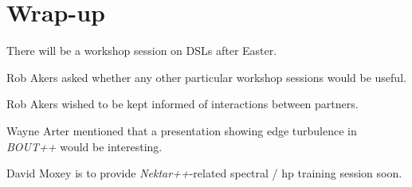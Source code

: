 
\section{Wrap-up}

There will be a workshop session on DSLs after Easter.  

Rob Akers asked whether any other particular workshop sessions would be useful.

Rob Akers wished to be kept informed of interactions between partners.

Wayne Arter mentioned that a presentation showing edge turbulence in {\it 
BOUT++} would be interesting.

David Moxey is to provide {\it Nektar++}-related spectral / hp training session 
soon.


